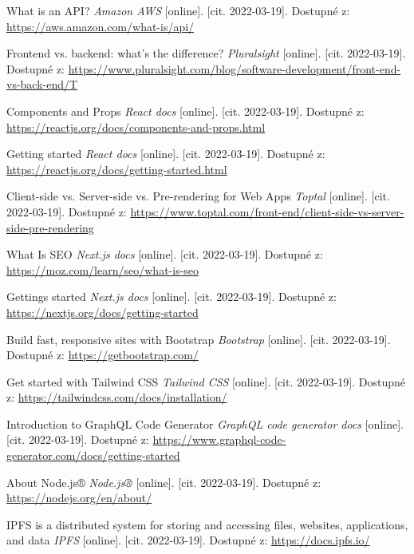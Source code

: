 \begin{thebibliography}{100}
     What is an API? \textit{Amazon AWS} [online]. [cit. 2022-03-19]. Dostupné z: \url{https://aws.amazon.com/what-is/api/}
    
     Frontend vs. backend: what's the difference? \textit{Pluralsight} [online]. [cit. 2022-03-19]. Dostupné z: \url{https://www.pluralsight.com/blog/software-development/front-end-vs-back-end/T}
    
     Components and Props \textit{React docs} [online]. [cit. 2022-03-19]. Dostupné z: \url{https://reactjs.org/docs/components-and-props.html}
    
     Getting started \textit{React docs} [online]. [cit. 2022-03-19]. Dostupné z: \url{https://reactjs.org/docs/getting-started.html}
    
     Client-side vs. Server-side vs. Pre-rendering for Web Apps \textit{Toptal} [online]. [cit. 2022-03-19]. Dostupné z: \url{https://www.toptal.com/front-end/client-side-vs-server-side-pre-rendering}
    
     What Is SEO \textit{Next.js docs} [online]. [cit. 2022-03-19]. Dostupné z: \url{https://moz.com/learn/seo/what-is-seo}
    
     Gettings started \textit{Next.js docs} [online]. [cit. 2022-03-19]. Dostupné z: \url{https://nextjs.org/docs/getting-started}
    
     Build fast, responsive sites with Bootstrap \textit{Bootstrap} [online]. [cit. 2022-03-19]. Dostupné z: \url{https://getbootstrap.com/}
    
     Get started with Tailwind CSS \textit{Tailwind CSS} [online]. [cit. 2022-03-19]. Dostupné z: \url{https://tailwindcss.com/docs/installation/}
    
     Introduction to GraphQL Code Generator \textit{GraphQL code generator docs} [online]. [cit. 2022-03-19]. Dostupné z: \url{https://www.graphql-code-generator.com/docs/getting-started}
    
     About Node.js® \textit{Node.js®} [online]. [cit. 2022-03-19]. Dostupné z: \url{https://nodejs.org/en/about/}
    
     IPFS is a distributed system for storing and accessing files, websites, applications, and data \textit{IPFS} [online]. [cit. 2022-03-19]. Dostupné z: \url{https://docs.ipfs.io/}
    

\end{thebibliography}
